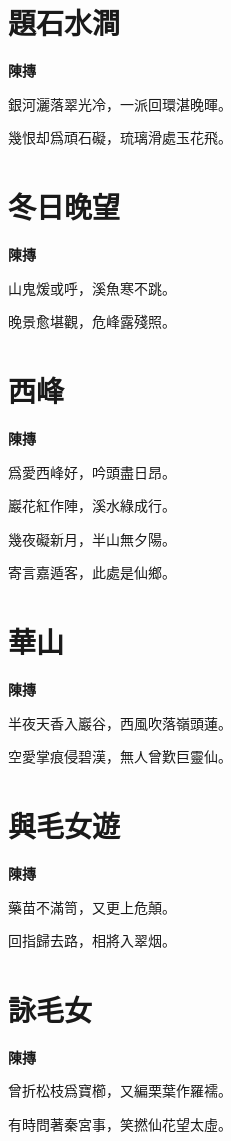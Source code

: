 \documentclass[12pt,a4paper]{ctexbook}
\begin{document}
\section{題石水澗}
\textbf{陳摶}\par\vspace{0.5em}
銀河灑落翠光冷，一派回環湛晚暉。\par
幾恨却爲頑石礙，琉璃滑處玉花飛。\par

\section{冬日晚望}
\textbf{陳摶}\par\vspace{0.5em}
山鬼煖或呼，溪魚寒不跳。\par
晚景愈堪觀，危峰露殘照。\par

\section{西峰}
\textbf{陳摶}\par\vspace{0.5em}
爲愛西峰好，吟頭盡日昂。\par
巖花紅作陣，溪水綠成行。\par
幾夜礙新月，半山無夕陽。\par
寄言嘉遁客，此處是仙鄉。\par

\section{華山}
\textbf{陳摶}\par\vspace{0.5em}
半夜天香入巖谷，西風吹落嶺頭蓮。\par
空愛掌痕侵碧漢，無人曾歎巨靈仙。\par

\section{與毛女遊}
\textbf{陳摶}\par\vspace{0.5em}
藥苗不滿笥，又更上危顛。\par
回指歸去路，相將入翠烟。\par

\section{詠毛女}
\textbf{陳摶}\par\vspace{0.5em}
曾折松枝爲寶櫛，又編栗葉作羅襦。\par
有時問著秦宮事，笑撚仙花望太虛。\par
\end{document}
